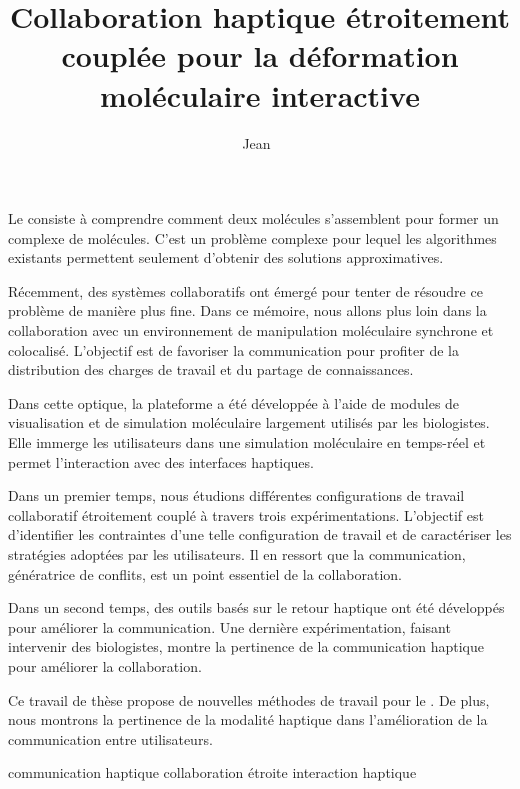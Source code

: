\documentclass[myfrancais,ngerman,english,french]{mythesis}
\title{Collaboration haptique étroitement couplée pour la déformation moléculaire interactive}
\author{Jean~\myname{Simard}}
\date{\mydate[datestyle=long]{01/02/2012}}
\date{\myemph{<à définir>}}
\begin{document}
	\frontmatter
	\maketitle
	\mytoc
	\mylof
	\mylot
	\begin{myabstract}[french]
		Le  consiste à comprendre comment deux molécules s'assemblent pour former un complexe de molécules.
		C'est un problème complexe pour lequel les algorithmes existants permettent seulement d'obtenir des solutions approximatives.

		Récemment, des systèmes collaboratifs ont émergé pour tenter de résoudre ce problème de manière plus fine.
		Dans ce mémoire, nous allons plus loin dans la collaboration avec un environnement de manipulation moléculaire synchrone et colocalisé.
		L'objectif est de favoriser la communication pour profiter de la distribution des charges de travail et du partage de connaissances.

		Dans cette optique, la plateforme \myShaddock a été développée à l'aide de modules de visualisation et de simulation moléculaire largement utilisés par les biologistes.
		Elle immerge les utilisateurs dans une simulation moléculaire en temps-réel et permet l'interaction avec des interfaces haptiques.

		Dans un premier temps, nous étudions différentes configurations de travail collaboratif étroitement couplé à travers trois expérimentations.
		L'objectif est d'identifier les contraintes d'une telle configuration de travail et de caractériser les stratégies adoptées par les utilisateurs.
		Il en ressort que la communication, génératrice de conflits, est un point essentiel de la collaboration.

		Dans un second temps, des outils basés sur le retour haptique ont été développés pour améliorer la communication.
		Une dernière expérimentation, faisant intervenir des biologistes, montre la pertinence de la communication haptique pour améliorer la collaboration.

		Ce travail de thèse propose de nouvelles méthodes de travail pour le .
		De plus, nous montrons la pertinence de la modalité haptique dans l'amélioration de la communication entre utilisateurs.
		\begin{mykeywords}
			\mykeyword {}
			\mykeyword communication haptique
			\mykeyword collaboration étroite
			\mykeyword interaction haptique
		\end{mykeywords}
	\end{myabstract}
\end{document}
